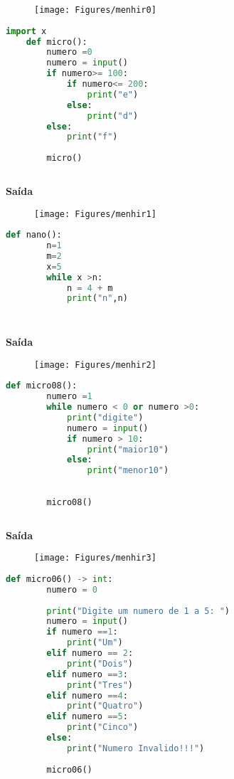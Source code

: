\documentclass[hidelinks,12pt]{article}
\begin{document}
	\begin{figure}[!h]
		\centering
		\texttt{[image: Figures/menhir0]}
	\end{figure}
	
	
	\begin{lstlisting}[caption=sintatico.mli, language=python]
	import x
	def micro(): 
		numero =0
		numero = input()
		if numero>= 100:
			if numero<= 200:
				print("e")
			else:
				print("d")
		else:
			print("f")
	
		micro()
	
	\end{lstlisting}
	
	\textbf{{\large Saída}}
	
	\begin{figure}[!h]
		\centering
		\texttt{[image: Figures/menhir1]}
	\end{figure}
\newpage	
	\begin{lstlisting}[caption=sintatico.mli, language=python]
	def nano():
		n=1
		m=2
		x=5
		while x >n:
			n = 4 + m
			print("n",n)
	
	
	\end{lstlisting}
	
	\textbf{{\large Saída}}
	
	\begin{figure}[!h]
		\centering
		\texttt{[image: Figures/menhir2]}
	\end{figure}
	\newpage
	
	\begin{lstlisting}[caption=sintatico.mli, language=python]
	def micro08():
		numero =1
		while numero < 0 or numero >0:
			print("digite")
			numero = input()
			if numero > 10:
				print("maior10")
			else:
				print("menor10")
		
		
		micro08()
	
	\end{lstlisting}
	
	\textbf{{\large Saída}}
	
	\begin{figure}[!h]
		\centering
		\texttt{[image: Figures/menhir3]}
	\end{figure}
	
	\begin{lstlisting}[caption=sintatico.mli, language=python]
	def micro06() -> int:
		numero = 0
		
		print("Digite um numero de 1 a 5: ")
		numero = input()
		if numero ==1: 
			print("Um")
		elif numero == 2:
			print("Dois")
		elif numero ==3:
			print("Tres")
		elif numero ==4:
			print("Quatro")
		elif numero ==5:
			print("Cinco")
		else:
			print("Numero Invalido!!!")
		
		micro06()
	
	\end{lstlisting}
	
\end{document}

